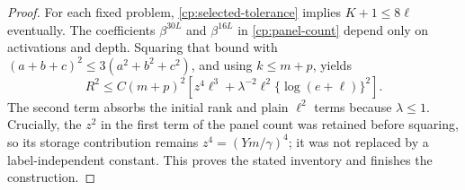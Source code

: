 \begin{proof}
For each fixed problem, \eqref{cp:selected-tolerance} implies
$K+1\le8\ell$ eventually. The coefficients $\beta^{30L}$ and
$\beta^{16L}$ in \eqref{cp:panel-count} depend only on activations
and depth. Squaring that bound with
$(a+b+c)^2\le3(a^2+b^2+c^2)$, and using $k\le m+p$, yields
\[
 R^2\le C(m+p)^2\left[
    z^4\ell^3+\lambda^{-2}\ell^2\{\log(e+\ell)\}^2\right].
\]
The second term absorbs the initial rank and plain $\ell^2$ terms
because $\lambda\le1$. Crucially, the $z^2$ in the first term of
the panel count was retained before squaring, so its storage
contribution remains $z^4=(Ym/\gamma)^4$; it was not replaced
by a label-independent constant. This proves the stated inventory
and finishes the construction.
\end{proof}
